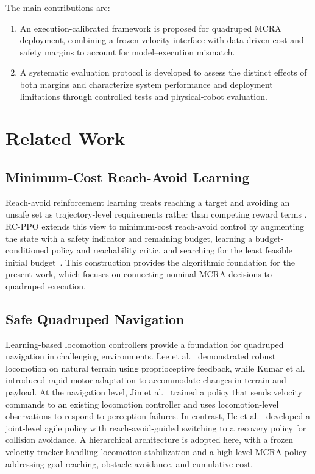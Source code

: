 \documentclass[conference]{IEEEtran}
\begin{document}
The main contributions are:
\begin{enumerate}
\item An execution-calibrated framework is proposed for quadruped MCRA
      deployment, combining a frozen velocity interface with data-driven cost and
      safety margins to account for model--execution mismatch.
\item A systematic evaluation protocol is developed to assess the distinct
      effects of both margins and characterize system performance and deployment
      limitations through controlled tests and physical-robot evaluation.
\end{enumerate}

\section{Related Work}
\subsection{Minimum-Cost Reach-Avoid Learning}
Reach-avoid reinforcement learning treats reaching a target and avoiding an unsafe
set as trajectory-level requirements rather than competing reward terms
\cite{bansal2017,ganai2023}. RC-PPO extends this view to minimum-cost reach-avoid
control by augmenting the state with a safety indicator and remaining budget,
learning a budget-conditioned policy and reachability critic, and searching for the
least feasible initial budget~\cite{so2024}. This construction provides the
algorithmic foundation for the present work, which focuses on connecting nominal
MCRA decisions to quadruped execution.

\subsection{Safe Quadruped Navigation}
Learning-based locomotion controllers provide a foundation for quadruped
navigation in challenging environments. Lee et al.~\cite{lee2020} demonstrated
robust locomotion on natural terrain using proprioceptive feedback, while Kumar
et al.~\cite{kumar2021} introduced rapid motor adaptation to accommodate changes
in terrain and payload. At the navigation level, Jin et al.~\cite{jin2023resilient}
trained a policy that sends velocity commands to an existing locomotion controller
and uses locomotion-level observations to respond to perception failures. In
contrast, He et al.~\cite{he2024abs} developed a joint-level agile policy with
reach-avoid-guided switching to a recovery policy for collision avoidance. A
hierarchical architecture is adopted here, with a frozen velocity tracker handling
locomotion stabilization and a high-level MCRA policy addressing goal reaching,
obstacle avoidance, and cumulative cost.
\end{document}
